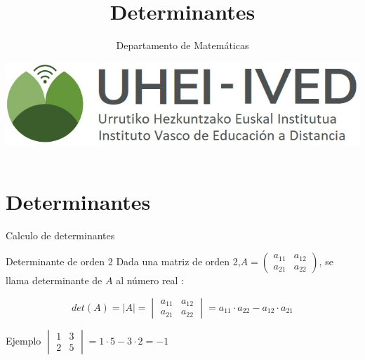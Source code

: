 \documentclass[9pt]{beamer}
\author{Departamento de Matemáticas}
\title{Determinantes}
\date{\includegraphics[scale=0.15]{imagenes/logoa.jpg}}
\begin{document}
\begin{frame}
\titlepage
\end{frame}

\begin{frame}
\tableofcontents
\end{frame}

\section{Determinantes}

\begin{frame}{Calculo de determinantes}

\begin{alertblock}{Determinante de orden 2}
Dada una matriz de orden 2,$A=\begin{pmatrix}
a_{11}& a_{12}  \\
a_{21} & a_{22} 
\end{pmatrix}$, se llama determinante de $A$ al número real : 

\[ det(A)= |A|= \begin{vmatrix}
a_{11}& a_{12}  \\
a_{21} & a_{22} 
\end{vmatrix}=a_{11} \cdot a_{22}-a_{12}\cdot a_{21} \]
\end{alertblock}
   \begin{exampleblock}{Ejemplo}
   $\begin{vmatrix}
1& 3  \\
2 &5 
\end{vmatrix}=1\cdot 5-3\cdot 2=-1 $
   \end{exampleblock}
\end{frame}
\end{document}
